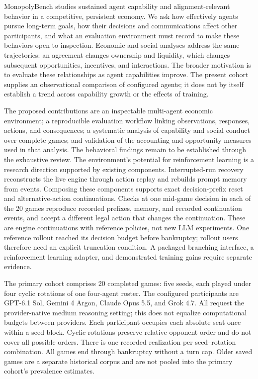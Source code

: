 
MonopolyBench studies sustained agent capability and alignment-relevant behavior
in a competitive, persistent economy. We ask how effectively agents pursue
long-term goals, how their decisions and communications affect other participants,
and what an evaluation environment must record to make these behaviors open to
inspection. Economic and social analyses address the same trajectories: an
agreement changes ownership and liquidity, which changes subsequent opportunities,
incentives, and interactions. The broader motivation is to evaluate these
relationships as agent capabilities improve. The present cohort supplies an
observational comparison of configured agents; it does not by itself establish
a trend across capability growth or the effects of training.

The proposed contributions are an inspectable multi-agent economic environment;
a reproducible evaluation workflow linking observations, responses, actions,
and consequences; a systematic analysis of capability and social conduct over
complete games; and validation of the accounting and opportunity measures used
in that analysis. The behavioral findings remain to be established through the
exhaustive review. The environment's potential for reinforcement learning is a
research direction supported by existing components. Interrupted-run recovery
reconstructs the live engine through action replay and rebuilds prompt memory
from events. Composing these components supports exact decision-prefix reset
and alternative-action continuations. Checks at one mid-game decision in each
of the 20 games reproduce recorded prefixes, memory, and recorded continuation
events, and accept a different legal action that changes the continuation.
These are engine continuations with reference policies, not new LLM experiments.
One reference rollout reached its decision budget before bankruptcy; rollout
users therefore need an explicit truncation condition. A packaged branching
interface, a reinforcement learning adapter, and demonstrated training gains
require separate evidence.

The primary cohort comprises 20 completed games: five seeds, each played under
four cyclic rotations of one four-agent roster. The configured participants are
GPT-6.1 Sol, Gemini 4 Argon, Claude Opus 5.5, and Grok 4.7. All request the
provider-native medium reasoning setting; this does not equalize computational
budgets between providers. Each participant occupies each absolute seat once
within a seed block. Cyclic rotations preserve relative opponent order and do
not cover all possible orders. There is one recorded realization per
seed--rotation combination. All games end through bankruptcy without a turn
cap. Older saved games are a separate historical corpus and are not pooled into
the primary cohort's prevalence estimates.

